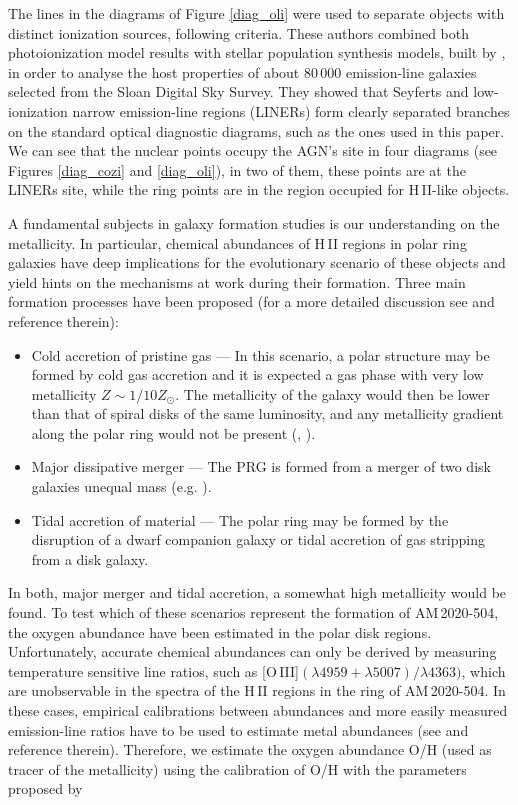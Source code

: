 \documentclass[useAMS,usenatbib]{mn2e}
\begin{document}
The lines in the diagrams of Figure \ref{diag_oli} were used to separate objects
with distinct ionization sources, following \cite{2006MNRAS.372..961K} criteria.
These authors combined both photoionization model results  with stellar
population synthesis models, built by \cite{2001ApJ...556..121K}, in order to
analyse the host properties of 
about 80\,000 emission-line galaxies selected from the Sloan Digital Sky Survey.
They showed that Seyferts and low-ionization narrow emission-line regions
(LINERs) form clearly separated branches on the standard optical diagnostic
diagrams, such as the ones used in this paper. We can see that the nuclear
points occupy the AGN's site in four diagrams (see Figures \ref{diag_cozi} and
\ref{diag_oli}), in two of them, these points are at the LINERs site, while the
ring points are in the region occupied for H\,II-like objects. 


 
A fundamental subjects in galaxy formation studies is  our understanding
on the metallicity. In particular,   chemical abundances of H\,II regions in
polar ring galaxies
 have  deep implications for the evolutionary scenario of these objects and
yield hints on the mechanisms
 at work during their formation.
 Three main formation processes have been proposed (for a more detailed
discussion see \citealt{2011A&A...531A..21S} and reference therein):
\begin{itemize}
\item Cold accretion of pristine  gas ---  In this scenario,   a polar structure
may be formed by cold gas accretion 
and it is expected a gas phase with very low  metallicity $Z\sim1/10 Z_{\odot}$.
The metallicity of the galaxy
would then be lower than that of spiral disks of the same luminosity, and any
metallicity gradient along the polar ring would not be present
(\citealt{2006ApJ...636L..25M}, \citealt{2009MNRAS.397L..64A}).
\item Major dissipative  merger --- The PRG is formed from a merger of two disk
galaxies unequal mass (e.g. \citealt{1997ApJ...483..608B}).
\item Tidal  accretion of material --- The polar ring  may be formed by the
disruption of a dwarf companion galaxy or tidal accretion of gas stripping
from a disk galaxy. 
\end{itemize}

In both, major merger and tidal accretion, a somewhat high metallicity would be
found.
To test which of these scenarios represent the formation of \mbox{AM\,2020-504},
  the oxygen abundance
have been estimated in the polar disk regions.
 Unfortunately, accurate chemical
abundances can only be derived by measuring temperature sensitive
line ratios, such as  [O\,III]$(\lambda4959+\lambda5007)/\lambda4363)$,
which are   unobservable  in the spectra of the  H\,II regions in the ring
of \mbox{AM\,2020-504}. In these cases, empirical calibrations between
abundances
and more easily measured emission-line ratios have to be used
to estimate metal abundances (see \citealt{2011MNRAS.415.3616D} and reference
therein). Therefore, we
estimate the oxygen abundance O/H (used as tracer of the metallicity)  using the
calibration of O/H with the  parameters
proposed by \cite{2009MNRAS.398..949P} 
\end{document}
